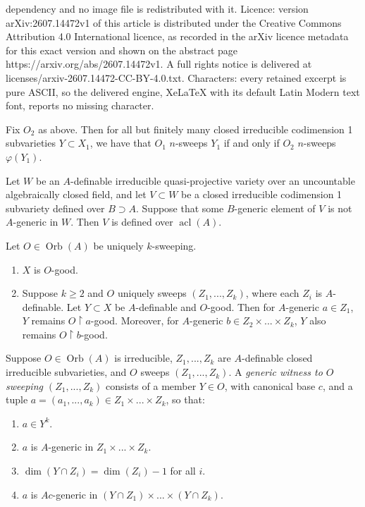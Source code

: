 \documentclass[10pt,a4paper]{amsart}
\newcommand{\acl}{\operatorname{acl}}
\begin{document}
dependency and no image file is redistributed with it. Licence: version arXiv:2607.14472v1 of this article is distributed under the Creative Commons Attribution 4.0 International licence, as recorded in the arXiv licence metadata for this exact version and shown on the abstract page https://arxiv.org/abs/2607.14472v1. A full rights notice is delivered at licenses/arxiv-2607.14472-CC-BY-4.0.txt. Characters: every retained excerpt is pure ASCII, so the delivered engine, XeLaTeX with its default Latin Modern text font, reports no missing character.
\begin{alphthm}[= Theorem \ref{T: preservation}]\label{T: intro link preservation} Fix $O_2$ as above. Then for all but finitely many closed irreducible codimension 1 subvarieties $Y\subset X_1$, we have that $O_1$ $n$-sweeps $Y_1$ if and only if $O_2$ $n$-sweeps $\varphi(Y_1)$.
\end{alphthm}

\begin{lemma}\label{L: codim 1 definable over acl}
    Let $W$ be an $A$-definable irreducible quasi-projective variety over an uncountable algebraically closed field, and let $V\subset W$ be a closed irreducible codimension 1 subvariety defined over $B\supset A$. Suppose that some $B$-generic element of $V$ is not $A$-generic in $W$. Then $V$ is defined over $\acl(A)$.
\end{lemma}

\begin{lemma}\label{L: good preservation}
    Let $O\in\operatorname{Orb}(A)$ be uniquely $k$-sweeping.
    \begin{enumerate}
        \item $X$ is $O$-good.
        \item Suppose $k\geq 2$ and $O$ uniquely sweeps $(Z_1,...,Z_k)$, where each $Z_i$ is $A$-definable. Let $Y\subset X$ be $A$-definable and $O$-good. Then for $A$-generic $a\in Z_1$, $Y$ remains $O\restriction a$-good. Moreover, for $A$-generic $b\in Z_2\times...\times Z_k$, $Y$ also remains $O\restriction b$-good.
        
    \end{enumerate}
\end{lemma}

\begin{definition}\label{D: generic sweeping witness}
    Suppose $O\in\operatorname{Orb}(A)$ is irreducible, $Z_1,...,Z_k$ are $A$-definable closed irreducible subvarieties, and $O$ sweeps $(Z_1,...,Z_k)$. A \textit{generic witness to $O$ sweeping $(Z_1,...,Z_k)$} consists of a member $Y\in O$, with canonical base $c$, and a tuple $a=(a_1,...,a_k)\in Z_1\times...\times Z_k$, so that:
    \begin{enumerate}
        \item $a\in Y^k$.
    \item $a$ is $A$-generic in $Z_1\times...\times Z_k$.
    \item $\dim(Y\cap Z_i)=\dim(Z_i)-1$ for all $i$.
    \item $a$ is $Ac$-generic in $(Y\cap Z_1)\times...\times(Y\cap Z_k)$.
    \end{enumerate}
\end{definition}
\end{document}
